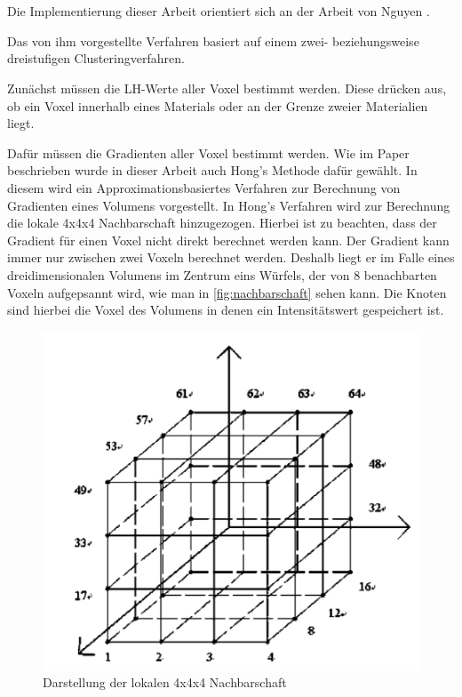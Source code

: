 \chapter{}
\label{sec:methods}


Die Implementierung dieser Arbeit orientiert sich an der Arbeit von Nguyen \cite{nguyen2012clustering}. 

Das von ihm vorgestellte Verfahren basiert auf einem zwei- beziehungsweise dreistufigen Clusteringverfahren.

Zunächst müssen die LH-Werte aller Voxel bestimmt werden. Diese drücken aus, ob ein Voxel innerhalb eines Materials oder an der Grenze zweier Materialien liegt.




Dafür müssen die Gradienten aller Voxel bestimmt werden. Wie im Paper beschrieben wurde in dieser Arbeit auch Hong's Methode \cite{hong2003method} dafür gewählt.
In diesem wird ein Approximationsbasiertes Verfahren zur Berechnung von Gradienten eines Volumens vorgestellt. 
\newline
 In Hong's Verfahren wird zur Berechnung die lokale 4x4x4 Nachbarschaft hinzugezogen. Hierbei ist zu beachten, dass der Gradient für einen Voxel nicht direkt berechnet werden kann. Der Gradient kann immer nur zwischen zwei Voxeln berechnet werden. Deshalb liegt er im Falle eines dreidimensionalen Volumens im Zentrum eins Würfels, der von 8 benachbarten Voxeln aufgepsannt wird, wie man in \autoref{fig:nachbarschaft} sehen kann. Die Knoten sind hierbei die Voxel des Volumens in denen ein Intensitätswert gespeichert ist.
\newline

\begin{figure}[!h] 
\centering 
\includegraphics[width=\textwidth]{Logos/VoxelEdges.PNG}
\caption{Darstellung der lokalen 4x4x4 Nachbarschaft} 
\label{fig:nachbarschaft} 
\end{figure}




